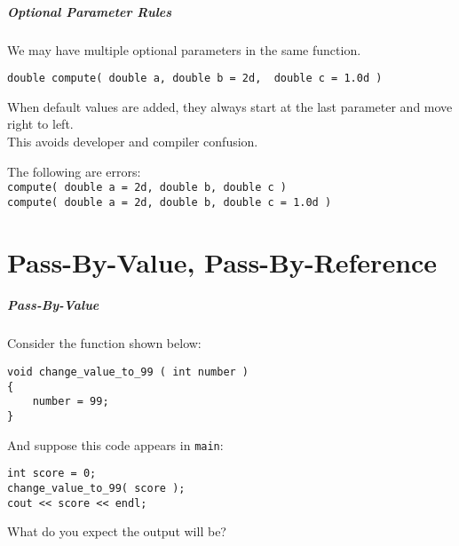 \begin{frame}[fragile]
\frametitle{Optional Parameter Rules}
We may have multiple optional parameters in the same function.
\vspace{-5em}

\begin{verbatim}
double compute( double a, double b = 2d,  double c = 1.0d )
\end{verbatim}

\vspace{-2em}

When default values are added, they always start at the last parameter and move right to left.\\
\quad This avoids developer and compiler confusion.

The following are errors:\\
\quad \texttt{compute( double a = 2d, double b,  double c )}\\
\quad \texttt{compute( double a = 2d, double b,  double c = 1.0d )}\\

\end{frame}



\part{Pass-By-Value, Pass-By-Reference}
\begin{frame}\partpage\end{frame}

\begin{frame}[fragile]
\frametitle{Pass-By-Value}
Consider the function shown below:

\begin{verbatim}
void change_value_to_99 ( int number )
{
    number = 99;
}
\end{verbatim}

And suppose this code appears in \texttt{main}:
\begin{verbatim}
int score = 0;
change_value_to_99( score );
cout << score << endl;
\end{verbatim}

What do you expect the output will be?

\end{frame}

